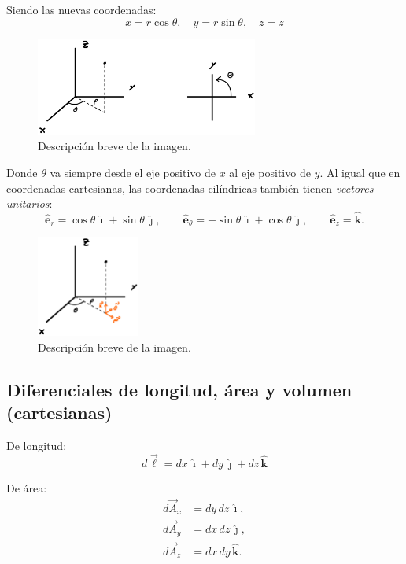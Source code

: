 \documentclass[a4paper,12pt]{article}
\begin{document}
\noindent Siendo las nuevas coordenadas:
\[
x = r\cos\theta, \quad y = r\sin\theta, \quad z = z
\]
\vspace{-2.0em}
\begin{figure}[h]
  \centering
  \includegraphics[width=0.65\textwidth]{imagen_5.jpeg}
  \caption{Descripción breve de la imagen.}
  \label{fig:imagen5}
\end{figure}

\noindent
Donde $\theta$ va siempre desde el eje positivo de $x$ al eje positivo de $y$.
Al igual que en coordenadas cartesianas, las coordenadas cilíndricas también tienen \textit{vectores unitarios}:
\[
\hat{\mathbf e}_r = \cos\theta\,\hat{\imath} + \sin\theta\,\hat{\jmath},\qquad
\hat{\mathbf e}_\theta = -\sin\theta\,\hat{\imath} + \cos\theta\,\hat{\jmath},\qquad
\hat{\mathbf e}_z = \hat{\mathbf k}.
\]
\vspace{-2.0em}
\begin{figure}[h]
  \centering
  \includegraphics[width=0.3\textwidth]{imagen_6.jpeg}
  \caption{Descripción breve de la imagen.}
  \label{fig:imagen6}
\end{figure}
\newpage

\subsection{Diferenciales de longitud, área y volumen (cartesianas)}

De longitud:
\[
d\vec{\ell} = dx\,\hat{\imath} + dy\,\hat{\jmath} + dz\,\hat{\mathbf k}
\]

De área:
\[
\begin{aligned}
d\vec{A}_x &= dy\,dz\,\hat{\imath},\\
d\vec{A}_y &= dx\,dz\,\hat{\jmath},\\
d\vec{A}_z &= dx\,dy\,\hat{\mathbf k}.
\end{aligned}
\]
\end{document}
